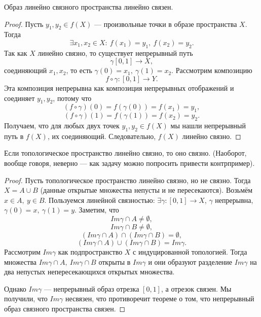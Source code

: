 \begin{statement}
    Образ линейно связного пространства линейно связен.
\end{statement}
\begin{proof}
    Пусть $y_1, y_2 \in f(X)$ — произвольные точки в образе пространства $X$. Тогда $$\exists x_1, x_2 \in X: \ f(x_1) = y_1, \ f(x_2) = y_2.$$
    Так как $X$ линейно связно, то существует непрерывный путь 
    \[\gamma [0,1] \to X,\]
    соединяющий $x_1, x_2$, то есть $\gamma(0) = x_1, \ \gamma(1) = x_2$.
Рассмотрим композицию
\[f \circ \gamma: [0,1] \to Y.\]
Эта композиция непрерывна как композиция непрерывных отображений и соединяет $y_1, y_2$, потому что 
\[(f \circ \gamma)(0) = f(\gamma(0)) = f(x_1) = y_1,\]
\[(f \circ \gamma)(1) = f(\gamma(1)) = f(x_2) = y_2.\]
Получаем, что для любых двух точек $y_1, y_2 \in f(X)$ мы нашли непрерывный путь в $f(X)$, их соединяющий. Следовательно, $f(X)$ линейно связно.
\end{proof}

\begin{statement}
    Если топологическое пространство линейно связно, то оно связно. (Наоборот, вообще говоря, неверно — как задачу можно попросить привести контрпример).
\end{statement}
\begin{proof}
    Пусть топологическое пространство линейно связно, но не связно. Тогда $X = A \cup B$ (данные открытые множества непусты и не пересекаются). Возьмём $x \in A, \ y \in B$. Пользуемся линейной связностью: $\exists \gamma: [0, 1] \to X$, $\gamma$ непрерывна, $\gamma(0) = x, \ \gamma(1) = y$.
    Заметим, что $$Im \gamma \cap A \neq \emptyset,$$ 
    $$Im \gamma \cap B \neq \emptyset,$$
    $$(Im \gamma \cap A) \cap (Im \gamma \cap B) = \emptyset,$$
    $$(Im \gamma \cap A) \cup (Im \gamma \cap B) = Im \gamma.$$
    Рассмотрим $Im \gamma$ как подпространство $X$ с индуцированной топологией. Тогда множества $Im \gamma \cap A, \ Im \gamma \cap B$ открыты в $Im \gamma$ и они образуют разделение $Im \gamma$ на два непустых непересекающихся открытых множества.

    Однако $Im \gamma$ — непрерывный образ отрезка $[0,1]$, а отрезок связен. Мы получили, что $Im \gamma$ несвязен, что противоречит теореме о том, что непрерывный образ связного пространства связен.
\end{proof}

